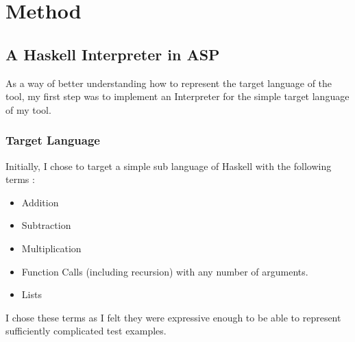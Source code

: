 \chapter{Method}

\section{A Haskell Interpreter in ASP}

As a way of better understanding how to represent the target language of the tool, my first step was to implement an Interpreter for the simple target language of my tool.

\subsection{Target Language}

Initially, I chose to target a simple sub language of Haskell with the following terms :

\begin{itemize}
\item Addition
\item Subtraction
\item Multiplication
\item Function Calls (including recursion) with any number of arguments.
\item Lists
\end{itemize}

I chose these terms as I felt they were expressive enough to be able to represent sufficiently complicated test examples.\\ \\

